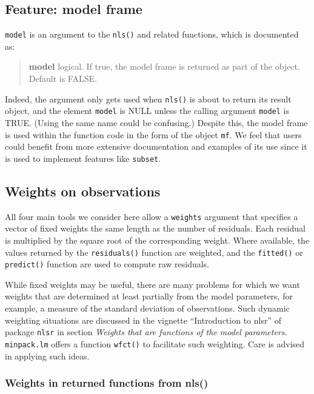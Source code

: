 \hypertarget{feature-model-frame}{%
\subsection{Feature: model frame}\label{feature-model-frame}}

\texttt{model} is an argument to the \texttt{nls()} and related functions, which is documented as:

\begin{quote}
\textbf{model} logical. If true, the model frame is returned as part of the object. Default is FALSE.
\end{quote}

Indeed, the argument only gets used when \texttt{nls()} is about to return its result
object, and the
element \texttt{model} is NULL unless the calling argument \texttt{model} is TRUE. (Using the same
name could
be confusing.) Despite this, the model frame is used within the function code in
the form of the object
\texttt{mf}. We feel that users could benefit from more extensive documentation and
examples of its use since it is used to implement features like \texttt{subset}.

\hypertarget{weights-on-observations}{%
\subsection{Weights on observations}\label{weights-on-observations}}

All four main tools we consider here allow a \texttt{weights} argument that
specifies a vector of fixed weights the same length as the number of residuals.
Each residual is multiplied by the square root of the corresponding weight.
Where available, the values returned by the
\texttt{residuals()} function are weighted, and the \texttt{fitted()} or \texttt{predict()} function are
used to compute raw residuals.

While fixed weights may be useful, there are many problems for which
we want weights that are determined at least partially from the model
parameters, for
example, a measure of the standard deviation of observations.
Such dynamic weighting situations are discussed in the vignette
``Introduction to nlsr'' of package \texttt{nlsr} in section
\emph{Weights that are functions of the model parameters}.
\texttt{minpack.lm} offers a function \texttt{wfct()} to
facilitate such weighting. Care is advised
in applying such ideas.

\hypertarget{weights-in-returned-functions-from-nls}{%
\subsubsection{Weights in returned functions from nls()}\label{weights-in-returned-functions-from-nls}}

